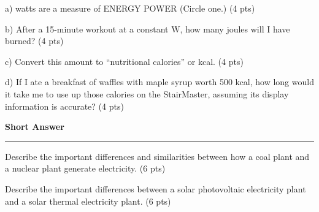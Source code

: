 \documentclass[12pt, oneside]{article}
\newif\ifsolution
\newcommand{\chead}[1]
{\begin{center}\large\textbf{#1}\end{center}
\hrule
\vspace{10pt}}
\newcommand{\solution}[1]
{\ifsolution
Answer: {\it #1}
\else\fi}
\begin{document}
a)  watts are a measure of
\hspace{1cm}
ENERGY
\hspace{1cm}
POWER
\hspace{1cm}
(Circle one.) (4 pts)

\solution{Power}

b) After a 15-minute workout at a constant  W, how many joules will I
have burned? (4 pts)

\solution{
Energy equals power multiplied by time.

$$ 200W \cdot 15 min \cdot \frac{60 sec}{1 min} = \py{kilojoules} kJ $$
}

\vfill

c) Convert this amount to “nutritional calories” or kcal. (4 pts)

\solution{
$$180 kJ \cdot \frac{1000J}{kJ} \cdot \frac{1 kcal}{4186 J} = 43 kcal $$
}

\vfill

d) If I ate a breakfast of waffles with maple syrup worth 500 kcal, how
long would it take me to use up those calories on the StairMaster,
assuming its display information is accurate? (4 pts)

\solution{
Here I assume that we are 100\% efficient in the conversion of food chemical
energy to kinetic energy.  Using energy equals power multiplied by time
and the rate of energy use we determined in c:

$$ 500 kcal = \frac{43 kcal}{15 min} \cdot X min $$
$$ X = 500 kcal \cdot  \frac{15 min}{43 kcal} = 174 min $$

Which is slightly less than 3 hours.
}

\vfill



\newpage
\chead{Short Answer}

Describe the important differences and similarities between how a coal
plant and a nuclear plant generate electricity. (6 pts)

\solution{Differences: The main difference is in the source of heat.  A
coal plant uses combustion of coal while a nuclear plant uses a chain
reaction of nuclear fission to create heat.

Similarities: The main
similarity is in the use of steam turbines to generate electricity
through a steam heat engine.}

\vfill

Describe the important differences between a solar photovoltaic
electricity plant and a solar thermal electricity plant. (6 pts)
\end{document}
